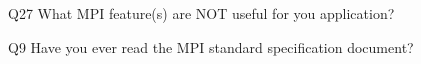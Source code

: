 \begin{description}%
\item{Q27} What MPI feature(s) are NOT useful for you application?%
\item{Q9} Have you ever read the MPI standard specification document?%
\end{description}%
